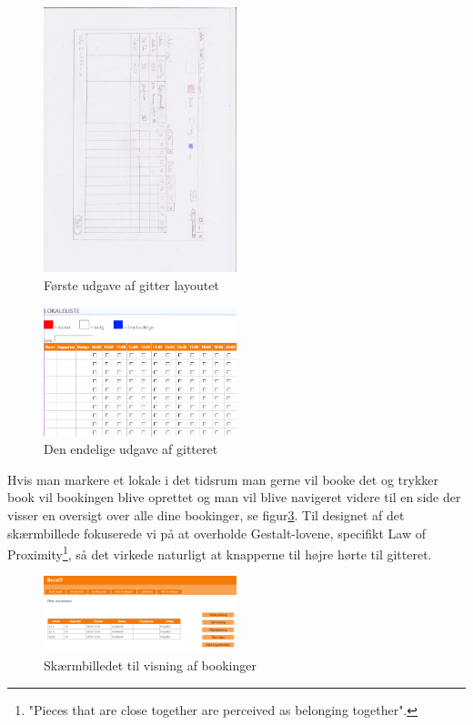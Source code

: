 \begin{figure}[h!]
  \centering
    \includegraphics[width=0.5\textwidth, angle=90]{Appendix/GUI-Prototype/PaperMockup/LokaleListe_001}
  \caption{Første udgave af gitter layoutet}
\label{Design_G_Development_FirstGrid}
\end{figure}

\begin{figure}[h!]
  \centering
    \includegraphics[width=0.5\textwidth]{Appendix/GUI-Prototype/DigitalMockup/GridEksempel}
  \caption{Den endelige udgave af gitteret}
\label{Design_G_Development_FinalGrid}
\end{figure}

 Hvis man markere et lokale i det tidsrum man gerne vil booke det og trykker book vil bookingen blive oprettet og man vil blive navigeret videre til en side der visser en oversigt over alle dine bookinger, se figur\ref{Design_G_Development_YourBookings_Final}. Til designet af det skærmbillede fokuserede vi på at overholde Gestalt-lovene\cite[s. 68]{SL_UID}, specifikt Law of Proximity\footnote{"Pieces that are close together are perceived as belonging together".}, så det virkede naturligt at knapperne til højre hørte til gitteret. 

\begin{figure}[h!]
  \centering
    \includegraphics[width=0.5\textwidth]{Appendix/GUI-Prototype/DigitalMockup/DineBookinger}
  \caption{Skærmbilledet til visning af bookinger}
\label{Design_G_Development_YourBookings_Final}
\end{figure} 

